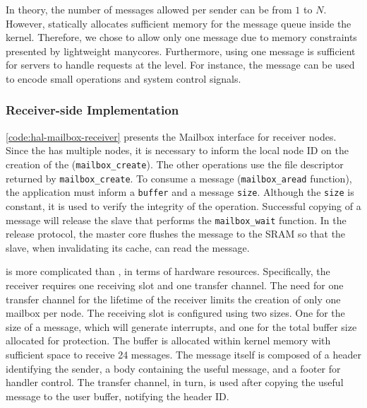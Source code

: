 			In theory, the number of messages allowed per sender can be from
			$1$ to $N$. However, \nanvixhal statically allocates sufficient
			memory for the message queue inside the kernel. Therefore, we chose
			to allow only one message due to memory constraints presented by
			lightweight manycores. Furthermore, using one message is sufficient	for
			servers to handle requests at the \nanvixmultikernel level. For instance, the
			message can be used to encode small operations and system control signals.
			
			\subsubsection{Receiver-side Implementation}

					\autoref{code:hal-mailbox-receiver} presents the Mailbox interface for
					receiver nodes. Since the \iocluster has multiple nodes, it is necessary
					to inform the local node ID on the creation of the \mailbox (\texttt{mailbox\_create}). The other
					operations use the file descriptor returned by \texttt{mailbox\_create}.
					To consume a message (\texttt{mailbox\_aread} function), the application must inform a \texttt{buffer} and
					a message \texttt{size}. Although the \texttt{size} is constant, it is used to verify the
					integrity of the operation. Successful copying of a message will release
					the slave that performs the \texttt{mailbox\_wait} function. In the release protocol, the
					master core flushes the message to the SRAM so that the slave, when
					invalidating its cache, can read the message.
					
					\mailbox is more complicated than \sync, in terms of hardware resources.
					Specifically, the receiver requires one \dnoc receiving slot and one \cnoc
					transfer channel. The need for one transfer channel for the lifetime
					of the receiver limits the creation of only one mailbox per \noc node.
					The receiving slot is configured using two sizes. One for the size of
					a message, which will generate interrupts, and one for the total buffer
					size allocated for protection. The buffer is allocated within kernel
					memory with sufficient space to receive 24 messages. The message
					itself is composed of a header identifying the sender, a body containing
					the useful message, and a footer for handler control. The transfer channel,
					in turn, is used after copying the useful message to the user buffer,
					notifying the header ID.
					
